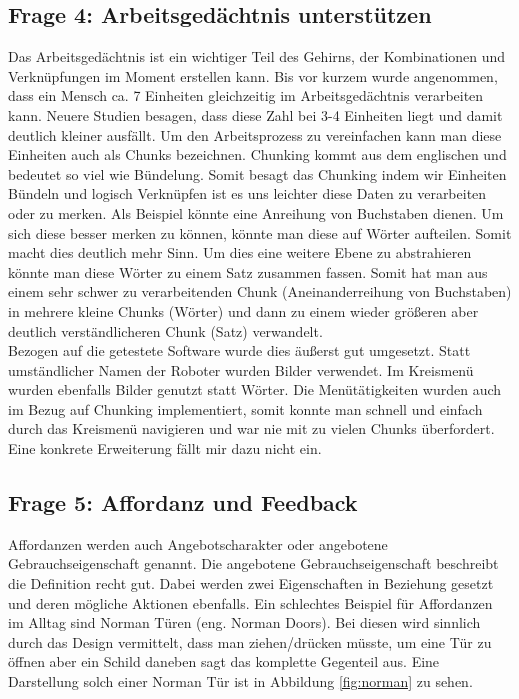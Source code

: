 \documentclass{TUBAFarbeiten}
\begin{document}
\subsection{Frage 4: Arbeitsgedächtnis unterstützen}
Das Arbeitsgedächtnis ist ein wichtiger Teil des Gehirns, der Kombinationen und Verknüpfungen im Moment erstellen kann. Bis vor kurzem wurde angenommen, dass ein Mensch ca. 7 Einheiten gleichzeitig im Arbeitsgedächtnis verarbeiten kann. Neuere Studien besagen, dass diese Zahl bei 3-4 Einheiten liegt und damit deutlich kleiner ausfällt. Um den Arbeitsprozess zu vereinfachen kann man diese Einheiten auch als Chunks bezeichnen. Chunking kommt aus dem englischen und bedeutet so viel wie Bündelung. Somit besagt das Chunking indem wir Einheiten Bündeln und logisch Verknüpfen ist es uns leichter diese Daten zu verarbeiten oder zu merken. Als Beispiel könnte eine Anreihung von Buchstaben dienen. Um sich diese besser merken zu können, könnte man diese auf Wörter aufteilen. Somit macht dies deutlich mehr Sinn. Um dies eine weitere Ebene zu abstrahieren könnte man diese Wörter zu einem Satz zusammen fassen. Somit hat man aus einem sehr schwer zu verarbeitenden Chunk (Aneinanderreihung von Buchstaben) in mehrere kleine Chunks (Wörter) und dann zu einem wieder größeren aber deutlich verständlicheren Chunk (Satz) verwandelt. \\
Bezogen auf die getestete Software wurde dies äußerst gut umgesetzt. Statt umständlicher Namen der Roboter wurden Bilder verwendet. Im Kreismenü wurden ebenfalls Bilder genutzt statt Wörter. Die Menütätigkeiten wurden auch im Bezug auf Chunking implementiert, somit konnte man schnell und einfach durch das Kreismenü navigieren und war nie mit zu vielen Chunks überfordert. Eine konkrete Erweiterung fällt mir dazu nicht ein.

\subsection{Frage 5: Affordanz und Feedback}
Affordanzen werden auch Angebotscharakter oder angebotene Gebrauchseigenschaft genannt. Die angebotene Gebrauchseigenschaft beschreibt die Definition recht gut. Dabei werden zwei Eigenschaften in Beziehung gesetzt und deren mögliche Aktionen ebenfalls. Ein schlechtes Beispiel für Affordanzen im Alltag sind Norman Türen (eng. Norman Doors). Bei diesen wird sinnlich durch das Design vermittelt, dass man ziehen/drücken müsste, um eine Tür zu öffnen aber ein Schild daneben sagt das komplette Gegenteil aus. Eine Darstellung solch einer Norman Tür  ist in Abbildung \ref{fig:norman} zu sehen. 
\end{document}
